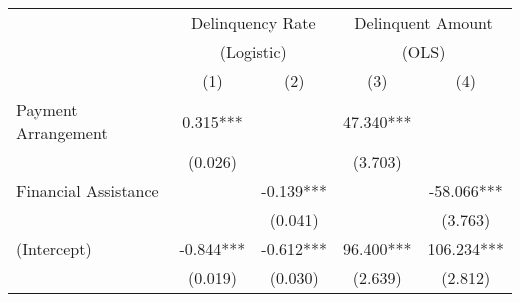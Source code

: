\begin{tabular}{lcccc}
\toprule 
\midrule 
 & \multicolumn{2}{c}{Delinquency Rate} & \multicolumn{2}{c}{Delinquent Amount} \\
 & \multicolumn{2}{c}{(Logistic)} & \multicolumn{2}{c}{(OLS)} \\
 \cmidrule(lr){2-3} \cmidrule(lr){4-5} 
 & (1) & (2) & (3) & (4) \\
\midrule 
Payment Arrangement & 0.315*** &  & 47.340*** &  \\
 & (0.026) &  & (3.703) &  \\
Financial Assistance &  & -0.139*** &  & -58.066*** \\
 &  & (0.041) &  & (3.763) \\
(Intercept) & -0.844*** & -0.612*** & 96.400*** & 106.234*** \\
 & (0.019) & (0.030) & (2.639) & (2.812) \\
\midrule 
\bottomrule 
\end{tabular}
